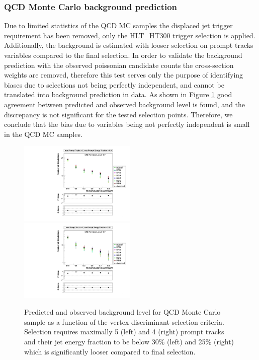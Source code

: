 \subsubsection{QCD Monte Carlo background prediction}
\label{subsubsec:bkgQCDMC}

Due to limited statistics of the QCD MC samples the displaced jet trigger requirement has been removed,
 only the HLT\_HT300 trigger selection is applied. Additionally, the background is estimated with looser
 selection on prompt tracks variables compared to the final selection. 
In order to validate the background prediction with 
the observed poissonian candidate counts the cross-section weights are removed, 
therefore this test serves only the purpose of identifying biases due to selections not being
perfectly independent, and cannot be translated
into background prediction in data.  
As shown in Figure \ref{fig:bkg_MC} good agreement between predicted and observed background level is found, 
and the discrepancy is not significant for the tested selection points. Therefore, we conclude that the  
bias due to variables being not perfectly independent is small in the QCD MC samples. 

\begin{figure}[htbp]
  \centering
  \includegraphics[width=0.495\textwidth]{plots/background/bkg_MC1.pdf}
  \includegraphics[width=0.495\textwidth]{plots/background/bkg_MC2.pdf}
  \caption{Predicted and observed background level for QCD Monte Carlo sample as a function of the vertex discriminant selection criteria.
Selection requires maximally 5 (left) and 4 (right)  prompt tracks and their jet energy fraction to be below 30\% (left) and 25\% (right) which
is significantly looser compared to final selection. \label{fig:bkg_MC}}
  \end{figure}


